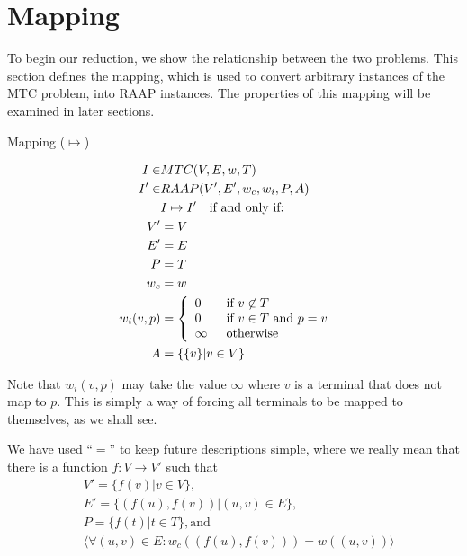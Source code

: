 \section{Mapping}

To begin our reduction, we show the relationship between the two problems.
This section defines the mapping, which is used to convert arbitrary instances of the MTC problem, into RAAP instances.
The properties of this mapping will be examined in later sections.

\begin{definition}
\label{defHardMap}
Mapping ($\mapsto$)

\begin{align}
	\nonumber I \in & MTC(V,E,w,T) &\\
	\nonumber I' \in & RAAP(V', E', w_c, w_i, P, A) &\\
	\nonumber & I \mapsto I' \quad \mbox{if and only if:} &\\
	\nonumber V' & = V\\
	\nonumber E' & = E\\
	\nonumber P & = T\\
	\nonumber w_c & = w\\
	\nonumber w_i(v,p) & = \mbox{$\left\{ 
		\begin{array}{l l}
			0 \quad & \mbox{if $v \not\in T$}\\
			0 & \mbox{if $v \in T$ and $p = v$}\\
			\infty & \mbox{otherwise}\\ \end{array} \right.$} \\
	\nonumber A & = \{\{v\} | v \in V\}
\end{align}

Note that $w_i(v, p)$ may take the value $\infty$ where $v$ is a terminal that does not map to $p$.
This is simply a way of forcing all terminals to be mapped to themselves, as we shall see.

We have used ``$=$'' to keep future descriptions simple, where we really mean that there is a function $f : V \rightarrow V'$ such that
\begin{align}
	\nonumber & V' = \{f(v) | v \in V\} , \\
	\nonumber & E' = \{(f(u), f(v)) | (u,v) \in E\} , \\
	\nonumber & P = \{f(t) | t \in T\} , \mbox{and} \\
	\nonumber & \langle \forall (u, v) \in E : w_c((f(u), f(v))) = w((u, v)) \rangle
\end{align}
\end{definition}

